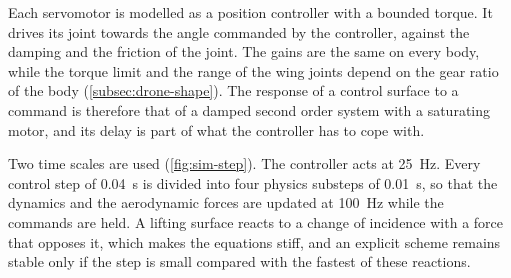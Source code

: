 Each servomotor is modelled as a position controller with a bounded torque. It drives its joint towards the angle commanded by the controller, against the damping and the friction of the joint. The gains are the same on every body, while the torque limit and the range of the wing joints depend on the gear ratio of the body (\autoref{subsec:drone-shape}). The response of a control surface to a command is therefore that of a damped second order system with a saturating motor, and its delay is part of what the controller has to cope with.

Two time scales are used (\autoref{fig:sim-step}). The controller acts at 25~Hz. Every control step of 0.04~s is divided into four physics substeps of 0.01~s, so that the dynamics and the aerodynamic forces are updated at 100~Hz while the commands are held. A lifting surface reacts to a change of incidence with a force that opposes it, which makes the equations stiff, and an explicit scheme remains stable only if the step is small compared with the fastest of these reactions.

